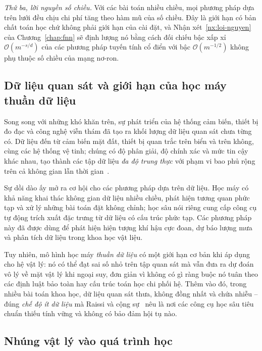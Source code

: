 \emph{Thứ ba, lời nguyền số chiều.} Với các bài toán nhiều chiều, mọi phương pháp
dựa trên lưới đều chịu chi phí tăng theo hàm mũ của số chiều. Đây là giới hạn có
bản chất toán học chứ không phải giới hạn của cài đặt, và
Nhận xét~\ref{nx:loi-nguyen} của Chương~\ref{chap:fnn} sẽ định lượng nó bằng cách
đối chiếu bậc xấp xỉ $\mathcal{O}(m^{-s/d})$ của các phương pháp tuyến tính cổ
điển với bậc $\mathcal{O}(m^{-1/2})$ không phụ thuộc số chiều của mạng nơ-ron.
 
\subsection{Dữ liệu quan sát và giới hạn của học máy thuần dữ liệu}
 
Song song với những khó khăn trên, sự phát triển của hệ thống cảm biến, thiết bị
đo đạc và công nghệ viễn thám đã tạo ra khối lượng dữ liệu quan sát chưa từng có.
Dữ liệu đến từ cảm biến mặt đất, thiết bị quan trắc trên biển và trên không, cùng
các hệ thống vệ tinh; chúng có độ phân giải, độ chính xác và mức tin cậy khác
nhau, tạo thành các tập dữ liệu \emph{đa độ trung thực} với phạm vi bao phủ rộng
trên cả không gian lẫn thời gian~\cite{karniadakis2021}.
 
Sự dồi dào ấy mở ra cơ hội cho các phương pháp dựa trên dữ liệu. Học máy có khả
năng khai thác không gian dữ liệu nhiều chiều, phát hiện tương quan phức tạp và
xử lý những bài toán đặt không chỉnh; học sâu nói riêng cung cấp công cụ tự động
trích xuất đặc trưng từ dữ liệu có cấu trúc phức tạp. Các phương pháp này đã được
dùng để phát hiện hiện tượng khí hậu cực đoan, dự báo lượng mưa và phân tích dữ
liệu trong khoa học vật liệu.
 
Tuy nhiên, mô hình học máy \emph{thuần dữ liệu} có một giới hạn cơ bản khi áp dụng
cho hệ vật lý: nó có thể đạt sai số nhỏ trên tập quan sát mà vẫn đưa ra dự đoán
vô lý về mặt vật lý khi ngoại suy, đơn giản vì không có gì ràng buộc nó tuân theo
các định luật bảo toàn hay cấu trúc toán học chi phối hệ. Thêm vào đó, trong nhiều
bài toán khoa học, dữ liệu quan sát thưa, không đồng nhất và chứa nhiễu -- đúng
\emph{chế độ ít dữ liệu} mà Raissi và cộng sự~\cite{raissi2019} nêu là nơi các
công cụ học sâu tiêu chuẩn thiếu tính vững và không có bảo đảm hội tụ nào.
 
\subsection{Nhúng vật lý vào quá trình học}
 
